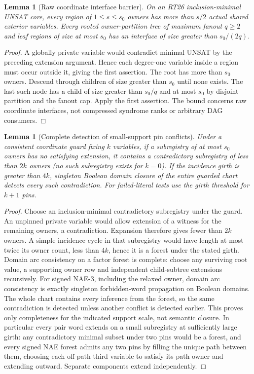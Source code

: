 \documentclass[11pt]{article}
\newtheorem{lemma}[theorem]{Lemma}
\begin{document}
\begin{lemma}[Raw coordinate interface barrier]\label{lem:bh20-boundary}
On an RT26 inclusion-minimal UNSAT core, every region of $1\le s\le s_0$ owners has more than $s/2$ actual shared exterior variables. Every rooted owner-partition tree of maximum fanout $q\ge2$ and leaf regions of size at most $s_0$ has an interface of size greater than $s_0/(2q)$.
\end{lemma}
\begin{proof}
A globally private variable would contradict minimal UNSAT by the preceding extension argument. Hence each degree-one variable inside a region must occur outside it, giving the first assertion. The root has more than $s_0$ owners. Descend through children of size greater than $s_0$ until none exists. The last such node has a child of size greater than $s_0/q$ and at most $s_0$ by disjoint partition and the fanout cap. Apply the first assertion. The bound concerns raw coordinate interfaces, not compressed syndrome ranks or arbitrary DAG consumers.
\end{proof}
\begin{lemma}[Complete detection of small-support pin conflicts]\label{lem:bh20-guard}
Under a consistent coordinate guard fixing $k$ variables, if a subregistry of at most $s_0$ owners has no satisfying extension, it contains a contradictory subregistry of less than $2k$ owners (no such subregistry exists for $k=0$). If the incidence girth is greater than $4k$, singleton Boolean domain closure of the entire guarded chart detects every such contradiction. For failed-literal tests use the girth threshold for $k+1$ pins.
\end{lemma}
\begin{proof}
Choose an inclusion-minimal contradictory subregistry under the guard. An unpinned private variable would allow extension of a witness for the remaining owners, a contradiction. Expansion therefore gives fewer than $2k$ owners. A simple incidence cycle in that subregistry would have length at most twice its owner count, less than $4k$, hence it is a forest under the stated girth. Domain arc consistency on a factor forest is complete: choose any surviving root value, a supporting owner row and independent child-subtree extensions recursively. For signed NAE-3, including the relaxed owner, domain arc consistency is exactly singleton forbidden-word propagation on Boolean domains. The whole chart contains every inference from the forest, so the same contradiction is detected unless another conflict is detected earlier. This proves only completeness for the indicated support scale, not semantic closure. In particular every pair word extends on a small subregistry at sufficiently large girth: any contradictory minimal subset under two pins would be a forest, and every signed NAE forest admits any two pins by filling the unique path between them, choosing each off-path third variable to satisfy its path owner and extending outward. Separate components extend independently.
\end{proof}
\end{document}
